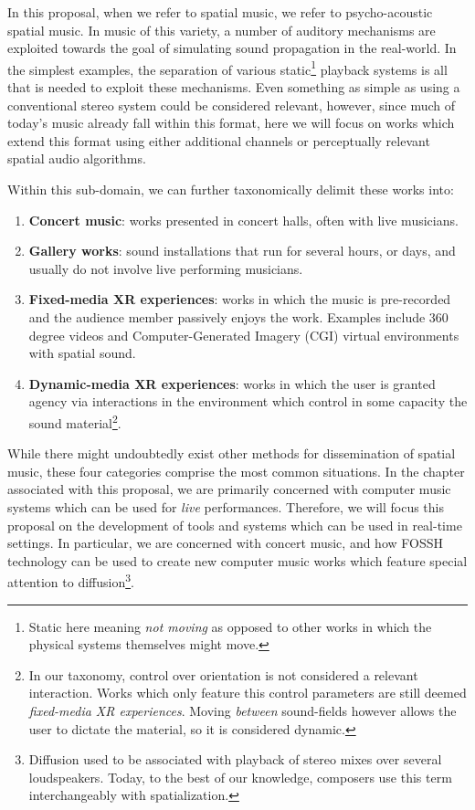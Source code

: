In this proposal, when we refer to spatial music, we refer to psycho-acoustic spatial music. In music of this variety, a number of auditory mechanisms are exploited towards the goal of simulating sound propagation in the real-world. In the simplest examples, the separation of various static\footnote{Static here meaning \textit{not moving} as opposed to other works in which the physical systems themselves might move.} playback systems is all that is needed to exploit these mechanisms. Even something as simple as using a conventional stereo system could be considered relevant, however, since much of today's music already fall within this format, here we will focus on works which extend this format using either additional channels or perceptually relevant spatial audio algorithms. 

Within this sub-domain, we can further taxonomically delimit these works into:
\begin{enumerate}
    \item \textbf{Concert music}: works presented in concert halls, often with live musicians. 
    \item \textbf{Gallery works}: sound installations that run for several hours, or days, and usually do not involve live performing musicians. 
    \item \textbf{Fixed-media XR experiences}: works in which the music is pre-recorded and the audience member passively enjoys the work. Examples include 360 degree videos and Computer-Generated Imagery (CGI) virtual environments with spatial sound. 
    \item \textbf{Dynamic-media XR experiences}: works in which the user is granted agency via interactions in the environment which control in some capacity the sound material\footnote{In our taxonomy, control over orientation is not considered a relevant interaction. Works which only feature this control parameters are still deemed \textit{fixed-media XR experiences}. Moving \textit{between} sound-fields however allows the user to dictate the material, so it is considered dynamic.}.
\end{enumerate}


While there might undoubtedly exist other methods for dissemination of spatial music, these four categories comprise the most common situations. In the chapter associated with this proposal, we are primarily concerned with computer music systems which can be used for \textit{live} performances. Therefore, we will focus this proposal on the development of tools and systems which can be used in real-time settings. In particular, we are concerned with concert music, and how FOSSH technology can be used to create new computer music works which feature special attention to diffusion\footnote{Diffusion used to be associated with playback of stereo mixes over several loudspeakers. Today, to the best of our knowledge, composers use this term interchangeably with spatialization.}.

